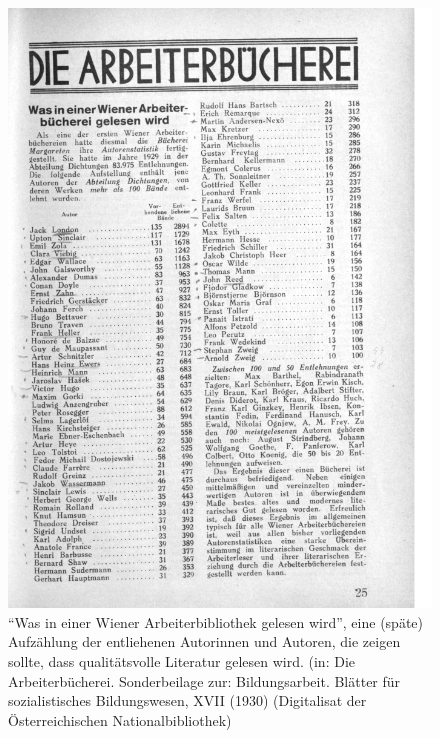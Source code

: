 \documentclass[a4paper,
fontsize=11pt,
oneside,
numbers=noperiodatend,
parskip=half-,
bibliography=totoc,
final
]{scrartcl}
\begin{document}
\begin{figure}
\centering
\includegraphics[width=14 cm]{img/Schuldt03.jpg}
\caption{\enquote{Was in einer Wiener Arbeiterbibliothek gelesen wird},
eine (späte) Aufzählung der entliehenen Autorinnen und Autoren, die
zeigen sollte, dass qualitätsvolle Literatur gelesen wird. (in: Die
Arbeiterbücherei. Sonderbeilage zur: Bildungsarbeit. Blätter für
sozialistisches Bildungswesen, XVII (1930) (Digitalisat der
Österreichischen Nationalbibliothek)}
\end{figure}
\end{document}
